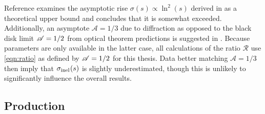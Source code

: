 

Reference \cite{Fagundes_2013} examines the asymptotic rise $\sigma(s) \propto \ln^2(s)$ derived in \cite{Froissart_1961}
as a theoretical upper bound and concludes that it is somewhat exceeded. Additionally, an asymptote $\mathscr{A} = 1/3$ due to
diffraction as opposed to the black disk limit $\mathscr{A} = 1/2 \kern+0.2pt$ from optical theorem predictions is suggested
in \cite{Fagundes_2013}. Because parameters are only available in the latter case, all calculations of the ratio $\mathscr{R}$
use \eqref{eqn:ratio} as defined by $\mathscr{A} = 1/2 \kern+0.2pt$ for this thesis. Data better matching $\mathscr{A} = 1/3$ then imply that
$\sigma_{\text{inel}\kern+0.5pt}(s)$ is slightly underestimated, though this is unlikely to significantly influence the overall results.





\subsection{Production}
\label{sub:production}

